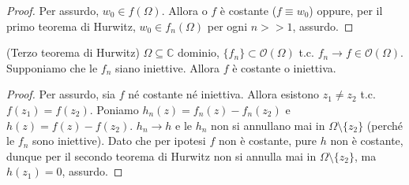\begin{proof}
  Per assurdo, $w_0 \in f(\Omega)$. Allora o $f$ è costante ($f \equiv w_0$) oppure, per il primo teorema di Hurwitz, $w_0 \in f_n(\Omega)$ per ogni $n>>1$, assurdo.
\end{proof}

\begin{cor}
  (Terzo teorema di Hurwitz) $\Omega \subseteq \mathbb{C}$ dominio, $\{f_n\} \subset \mathcal{O}(\Omega)$ t.c. $f_n \longrightarrow f \in \mathcal{O}(\Omega)$. Supponiamo che le $f_n$ siano iniettive. Allora $f$ è costante o iniettiva.
\end{cor}

\begin{proof}
  Per assurdo, sia $f$ né costante né iniettiva. Allora esistono $z_1 \not=z_2$ t.c. $f(z_1)=f(z_2)$. Poniamo $h_n(z)=f_n(z)-f_n(z_2)$ e $h(z)=f(z)-f(z_2)$. $h_n \longrightarrow h$ e le $h_n$ non si annullano mai in $\Omega \setminus \{z_2\}$ (perché le $f_n$ sono iniettive). Dato che per ipotesi $f$ non è costante, pure $h$ non è costante, dunque per il secondo teorema di Hurwitz non si annulla mai in $\Omega \setminus \{z_2\}$, ma $h(z_1)=0$, assurdo.
\end{proof}
